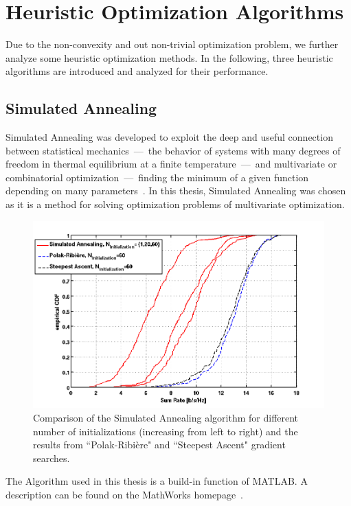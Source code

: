 \section{Heuristic Optimization Algorithms}
\label{sec:heuristic}
Due to the non-convexity and out non-trivial optimization problem, we further analyze some heuristic optimization methods.
In the following, three heuristic algorithms are introduced and analyzed for their performance.

\subsection{Simulated Annealing}
\label{sec:sim_annealing}
Simulated Annealing was developed to exploit the deep and useful connection between statistical mechanics~---~the behavior of systems with many degrees of freedom in thermal equilibrium at a finite temperature~---~and multivariate or combinatorial optimization~---~finding the minimum of a given function depending on many parameters~\cite{Kirkpatrick83}.
In this thesis, Simulated Annealing was chosen as it is a method for solving optimization problems of multivariate optimization.
\begin{figure}[h]
\centering
  \includegraphics[width=0.8\linewidth]{images/Simannealcomparison.png}
\caption{Comparison of the Simulated Annealing algorithm for different number of initializations (increasing from left to right) and the results from ``Polak-Ribi\`{e}re" and ``Steepest Ascent" gradient searches.}
\label{fig:heur_sa}
\end{figure}
The Algorithm used in this thesis is a build-in function of MATLAB.
A description can be found on the MathWorks homepage~\cite{matlab:simulann}.
 

